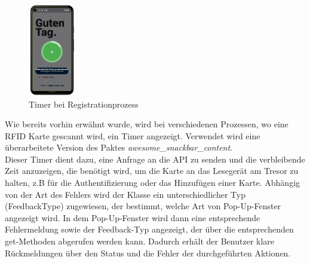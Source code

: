 {{\label{subsec:impl:timer}
\begin{figure}
\centering
    \includegraphics[width=0.18\textwidth]{FLUTTER/images/GP/Login_timer.png}
    \caption{Timer bei Registrationprozess}
    \label{fig:client_allg}
\end{figure}
Wie bereits vorhin erwähnt wurde, wird bei verschiedenen Prozessen, wo eine RFID Karte gescannt wird, ein Timer angezeigt. Verwendet wird eine überarbeitete Version des Paktes {\textit{awesome\_snackbar\_content}}.
\\
Dieser Timer dient dazu, eine Anfrage an die API zu senden und die verbleibende Zeit anzuzeigen, die benötigt wird, um die Karte an das Lesegerät am Tresor zu halten, z.B für die Authentifizierung oder das Hinzufügen einer Karte. Abhängig von der Art des Fehlers wird der Klasse ein unterschiedlicher Typ (FeedbackType) zugewiesen, der bestimmt, welche Art von Pop-Up-Fenster angezeigt wird. In dem Pop-Up-Fenster wird dann eine entsprechende Fehlermeldung sowie der Feedback-Typ angezeigt, der über die entsprechenden get-Methoden abgerufen werden kann. Dadurch erhält der Benutzer klare Rückmeldungen über den Status und die Fehler der durchgeführten Aktionen.

}}
